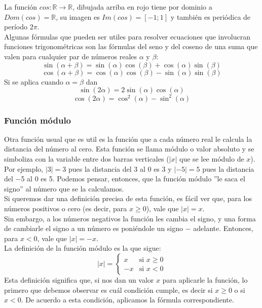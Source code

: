 \documentclass[Análisis.root.tex]{subfiles}
\newcommand{\R}{\mathbb{R}}
\begin{document}
        La función \(cos:\R\rightarrow\R\), dibujada arriba en rojo tiene por dominio a \(Dom(cos) = \R\), su imagen es \(Im(cos) = [−1; 1]\) y también es periódica de período \(2\pi\).\\
        Algunas fórmulas que pueden ser utiles para resolver ecuaciones que involucran funciones trigonométricas son las fórmulas del seno y del coseno de una suma que valen para cualquier par de números reales \(\alpha\) y \(\beta\):
        \[\sin(\alpha+\beta)=\sin(\alpha)\cos(\beta)+\cos(\alpha)\sin(\beta)\]
        \[\cos(\alpha+\beta)=\cos(\alpha)\cos(\beta)-\sin(\alpha)\sin(\beta)\]
        Si se aplica cuando \(\alpha=\beta\) dan
        \[\sin(2\alpha)=2\sin(\alpha)\cos(\alpha)\]
        \[\cos(2\alpha)=\cos^2(\alpha)-\sin^2(\alpha)\]
        \subsubsection{Función módulo}
        Otra función usual que es util es la función que a cada número real le calcula la distancia del número al cero. Esta función se llama módulo o valor absoluto y se simboliza con la variable entre dos barras verticales (\(|x|\) que se lee módulo de \(x\)).\\
        Por ejemplo, \(|3| = 3\) pues la distancia del 3 al 0 es 3 y \(|−5| = 5\) pues la distancia del −5 al 0 es 5. Podemos pensar, entonces, que la función módulo ”le saca el signo” al número que se la calculamos.\\
        Si queremos dar una definición precisa de esta función, es fácil ver que, para los números positivos o cero (es decir, para \(x \geq 0\)), vale que \(|x| = x\).\\
        Sin embargo, a los números negativos la función les cambia el signo, y una forma de cambiarle el signo a un número es poniéndole un signo \(−\) adelante. Entonces, para \(x < 0\), vale que \(|x| = −x\).\\
        La definición de la función módulo es la que sigue: 
        \[|x|=
            \begin{cases}
                x & \text{si }x\geq0\\
                -x & \text{si }x<0
            \end{cases}
        \]
        Esta definición significa que, si nos dan un valor \(x\) para aplicarle la función, lo primero que debemos observar es cuál condición cumple, es decir si \(x \geq 0\) o si \(x < 0\). De acuerdo a esta condición, aplicamos la fórmula correspondiente.\\
\end{document}
